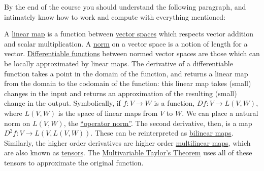 By the end of the course you should understand the following paragraph, 
and intimately know how to work and compute with everything mentioned:

A \href{http://en.wikipedia.org/wiki/Linear_map}{linear map} is a function between \href{http://en.wikipedia.org/wiki/Vector_space}{vector spaces} 
which respects vector addition and scalar multiplication.  A \href{http://en.wikipedia.org/wiki/Norm_(mathematics)}{norm} on a vector space is a notion of
length for a vector.  \href{http://en.wikipedia.org/wiki/Differentiable#Differentiability_in_higher_dimensions}{Differentiable functions} between normed vector
 spaces are those which can be locally approximated by linear maps.  
The derivative of a differentiable function takes a point in the domain of the function, and returns a linear map from the domain to the codomain of the function:
this linear map takes (small) changes in the input and returns an approximation of the resulting (small) change in the output.  Symbolically, if $f: V \to W$ is a function, 
$Df: V \to L(V,W)$, where $L(V,W)$ is the space of linear maps from $V$ to $W$.  We can place a natural norm on $L(V,W)$, the 
\href{http://en.wikipedia.org/wiki/Operator_norm}{``operator norm''}.
 The second derivative, then, is a map $D^2f: V \to L(V,L(V,W))$.  These can be reinterpreted as \href{http://en.wikipedia.org/wiki/Bilinear_operator}{bilinear maps}.  
 Similarly, the higher order derivatives are higher order \href{http://en.wikipedia.org/wiki/Multilinear_map}{multilinear maps}, which are also known as 
 \href{http://en.wikipedia.org/wiki/Tensor}{tensors}.  
 The \href{http://en.wikipedia.org/wiki/Taylors_theorem#Taylor.27s_theorem_for_multivariate_functions}{Multivariable Taylor's Theorem} 
 uses all of these tensors to approximate the original function.
